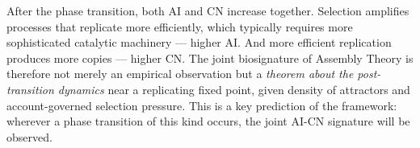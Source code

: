 \begin{remark}
After the phase transition, both $\mathrm{AI}$ and $\mathrm{CN}$
increase together.
Selection amplifies processes that replicate more efficiently,
which typically requires more sophisticated catalytic machinery
--- higher $\mathrm{AI}$.
And more efficient replication produces more copies --- higher
$\mathrm{CN}$.
The joint biosignature of Assembly Theory is therefore not merely
an empirical observation but a \emph{theorem about the
post-transition dynamics} near a replicating fixed point, given
density of attractors and account-governed selection pressure.
This is a key prediction of the framework: wherever a phase
transition of this kind occurs, the joint $\mathrm{AI}$-$\mathrm{CN}$
signature will be observed.
\end{remark}

